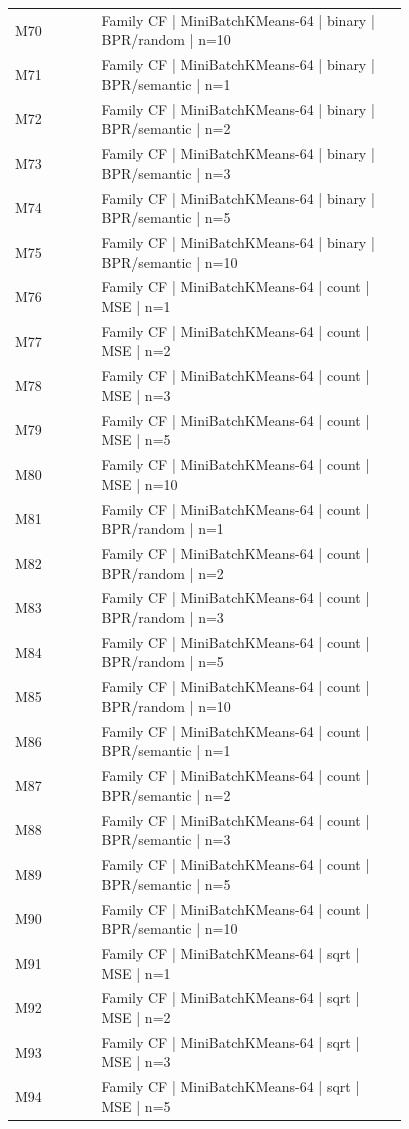 \begin{longtable}{lp{0.78\linewidth}}
M70 & Family CF | MiniBatchKMeans-64 | binary | BPR/random | n=10 \\
M71 & Family CF | MiniBatchKMeans-64 | binary | BPR/semantic | n=1 \\
M72 & Family CF | MiniBatchKMeans-64 | binary | BPR/semantic | n=2 \\
M73 & Family CF | MiniBatchKMeans-64 | binary | BPR/semantic | n=3 \\
M74 & Family CF | MiniBatchKMeans-64 | binary | BPR/semantic | n=5 \\
M75 & Family CF | MiniBatchKMeans-64 | binary | BPR/semantic | n=10 \\
M76 & Family CF | MiniBatchKMeans-64 | count | MSE | n=1 \\
M77 & Family CF | MiniBatchKMeans-64 | count | MSE | n=2 \\
M78 & Family CF | MiniBatchKMeans-64 | count | MSE | n=3 \\
M79 & Family CF | MiniBatchKMeans-64 | count | MSE | n=5 \\
M80 & Family CF | MiniBatchKMeans-64 | count | MSE | n=10 \\
M81 & Family CF | MiniBatchKMeans-64 | count | BPR/random | n=1 \\
M82 & Family CF | MiniBatchKMeans-64 | count | BPR/random | n=2 \\
M83 & Family CF | MiniBatchKMeans-64 | count | BPR/random | n=3 \\
M84 & Family CF | MiniBatchKMeans-64 | count | BPR/random | n=5 \\
M85 & Family CF | MiniBatchKMeans-64 | count | BPR/random | n=10 \\
M86 & Family CF | MiniBatchKMeans-64 | count | BPR/semantic | n=1 \\
M87 & Family CF | MiniBatchKMeans-64 | count | BPR/semantic | n=2 \\
M88 & Family CF | MiniBatchKMeans-64 | count | BPR/semantic | n=3 \\
M89 & Family CF | MiniBatchKMeans-64 | count | BPR/semantic | n=5 \\
M90 & Family CF | MiniBatchKMeans-64 | count | BPR/semantic | n=10 \\
M91 & Family CF | MiniBatchKMeans-64 | sqrt | MSE | n=1 \\
M92 & Family CF | MiniBatchKMeans-64 | sqrt | MSE | n=2 \\
M93 & Family CF | MiniBatchKMeans-64 | sqrt | MSE | n=3 \\
M94 & Family CF | MiniBatchKMeans-64 | sqrt | MSE | n=5 \\

\end{longtable}
